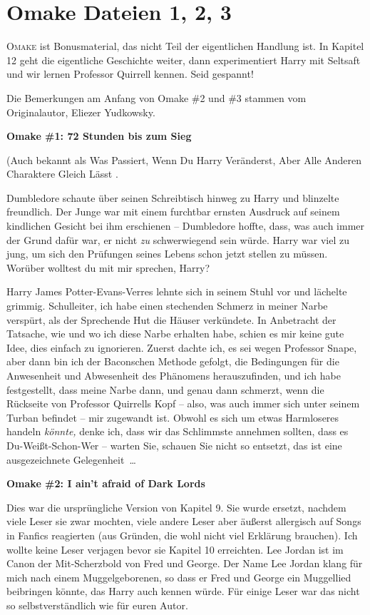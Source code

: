 \chapter{Omake Dateien 1, 2, 3}

\lettrine{\glqq O}{make} ist Bonusmaterial, das nicht Teil der eigentlichen
Handlung ist. In Kapitel 12 geht die eigentliche Geschichte weiter, dann
experimentiert Harry mit Seltsaft und wir lernen Professor Quirrell kennen. Seid
gespannt!

Die Bemerkungen am Anfang von Omake \#2 und \#3 stammen vom Originalautor,
Eliezer Yudkowsky.

\textbf{Omake \#1: 72 Stunden bis zum Sieg}

(Auch bekannt als \glqq Was Passiert, Wenn Du Harry Veränderst, Aber Alle
Anderen Charaktere Gleich Lässt\grqq{} .

Dumbledore schaute über seinen Schreibtisch hinweg zu Harry und blinzelte
freundlich. Der Junge war mit einem furchtbar ernsten Ausdruck auf seinem
kindlichen Gesicht bei ihm erschienen – Dumbledore hoffte, dass, was auch immer
der Grund dafür war, er nicht \emph{zu} schwerwiegend sein würde. Harry war viel
zu jung, um sich den Prüfungen seines Lebens schon jetzt stellen zu müssen.
\glqq Worüber wolltest du mit mir sprechen, Harry?\grqq{}

Harry James Potter-Evans-Verres lehnte sich in seinem Stuhl vor und lächelte
grimmig. \glqq Schulleiter, ich habe einen stechenden Schmerz in meiner Narbe
verspürt, als der Sprechende Hut die Häuser verkündete. In Anbetracht der
Tatsache, wie und wo ich diese Narbe erhalten habe, schien es mir keine gute
Idee, dies einfach zu ignorieren. Zuerst dachte ich, es sei wegen Professor
Snape, aber dann bin ich der Baconschen Methode gefolgt, die Bedingungen für die
Anwesenheit und Abwesenheit des Phänomens herauszufinden, und ich habe
festgestellt, dass meine Narbe dann, und genau dann schmerzt, wenn die Rückseite
von Professor Quirrells Kopf – also, was auch immer sich unter seinem Turban
befindet – mir zugewandt ist. Obwohl es sich um etwas Harmloseres handeln
\emph{könnte,} denke ich, dass wir das Schlimmste annehmen sollten, dass es
Du-Weißt-Schon-Wer – warten Sie, schauen Sie nicht so entsetzt, das ist eine
ausgezeichnete Gelegenheit …\grqq{}

\textbf{Omake \#2: I ain't afraid of Dark Lords}

Dies war die ursprüngliche Version von Kapitel 9. Sie wurde ersetzt, nachdem
viele Leser sie zwar mochten, viele andere Leser aber äußerst allergisch auf
Songs in Fanfics reagierten (aus Gründen, die wohl nicht viel Erklärung
brauchen). Ich wollte keine Leser verjagen bevor sie Kapitel 10 erreichten. Lee
Jordan ist im Canon der Mit-Scherzbold von Fred und George. Der Name \grqq{} Lee
Jordan\grqq{} klang für mich nach einem Muggelgeborenen, so dass er Fred und
George ein Muggellied beibringen könnte, das Harry auch kennen würde. Für einige
Leser war das nicht so selbstverständlich wie für euren Autor.


